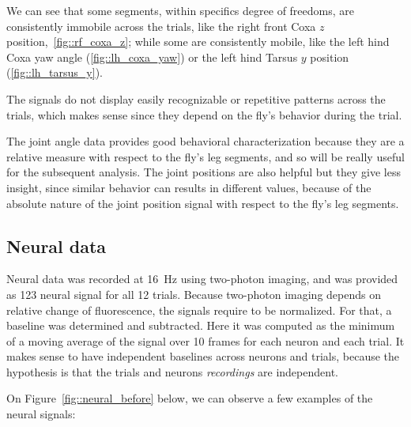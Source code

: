 We can see that some segments, within specifics degree of freedoms, are consistently immobile across the trials, like the right front Coxa $z$ position,~\ref{fig::rf_coxa_z}; while some are consistently mobile, like the left hind Coxa yaw angle (\ref{fig::lh_coxa_yaw}) or the left hind Tarsus $y$ position (\ref{fig::lh_tarsus_y}).

The signals do not display easily recognizable or repetitive patterns across the trials, which makes sense since they depend on the fly's behavior during the trial.

The joint angle data provides good behavioral characterization because they are a relative measure with respect to the fly's leg segments, and so will be really useful for the subsequent analysis.
The joint positions are also helpful but they give less insight, since similar behavior can results in different values, because of the absolute nature of the joint position signal with respect to the fly's leg segments.

\subsection{Neural data}

Neural data was recorded at \SI{16}{\hertz} using two-photon imaging, and was provided as 123 neural signal for all 12 trials.
Because two-photon imaging depends on relative change of fluorescence, the signals require to be normalized.
For that, a baseline was determined and subtracted.
Here it was computed as the minimum of a moving average of the signal over 10 frames for each neuron and each trial.
It makes sense to have independent baselines across neurons and trials, because the hypothesis is that the trials and neurons \textit{recordings} are independent.

\vspace{\baselineskip}

On Figure~\ref{fig::neural_before} below, we can observe a few examples of the neural signals:

